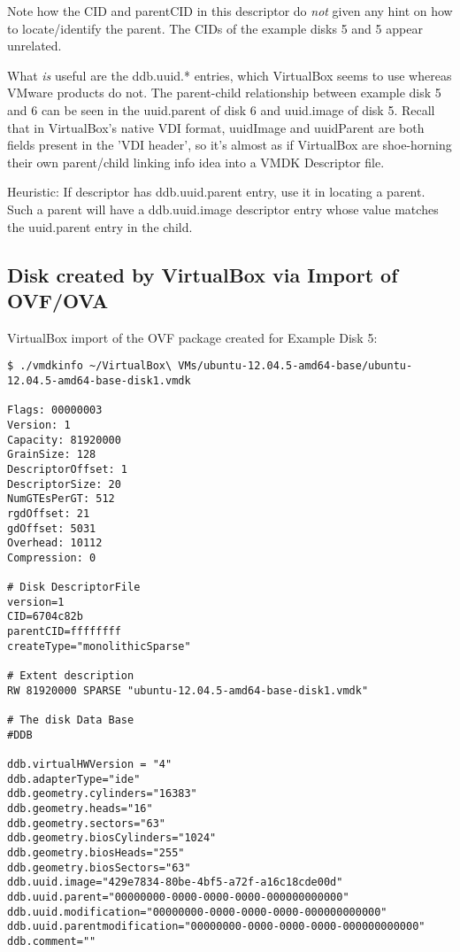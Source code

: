 \documentclass{article}
\begin{document}
Note how the CID and parentCID in this descriptor do {\em not} given
any hint on how to locate/identify the parent. The CIDs of the example
disks 5 and 5 appear unrelated.

What {\em is} useful are the ddb.uuid.* entries, which VirtualBox
seems to use whereas VMware products do not.  The parent-child
relationship between example disk 5 and 6 can be seen in the
uuid.parent of disk 6 and uuid.image of disk 5.  Recall that in
VirtualBox's native VDI format, uuidImage and uuidParent are both
fields present in the 'VDI header', so it's almost as if VirtualBox
are shoe-horning their own parent/child linking info idea into a VMDK
Descriptor file.


Heuristic: If descriptor has ddb.uuid.parent entry, use it in locating
a parent.  Such a parent will have a ddb.uuid.image descriptor entry
whose value matches the uuid.parent entry in the child.


\subsection{Disk created by VirtualBox via Import of OVF/OVA}

VirtualBox import of the OVF package created for Example Disk 5:

\begin{verbatim}
$ ./vmdkinfo ~/VirtualBox\ VMs/ubuntu-12.04.5-amd64-base/ubuntu-12.04.5-amd64-base-disk1.vmdk 

Flags: 00000003
Version: 1
Capacity: 81920000
GrainSize: 128
DescriptorOffset: 1
DescriptorSize: 20
NumGTEsPerGT: 512
rgdOffset: 21
gdOffset: 5031
Overhead: 10112
Compression: 0

# Disk DescriptorFile
version=1
CID=6704c82b
parentCID=ffffffff
createType="monolithicSparse"

# Extent description
RW 81920000 SPARSE "ubuntu-12.04.5-amd64-base-disk1.vmdk"

# The disk Data Base 
#DDB

ddb.virtualHWVersion = "4"
ddb.adapterType="ide"
ddb.geometry.cylinders="16383"
ddb.geometry.heads="16"
ddb.geometry.sectors="63"
ddb.geometry.biosCylinders="1024"
ddb.geometry.biosHeads="255"
ddb.geometry.biosSectors="63"
ddb.uuid.image="429e7834-80be-4bf5-a72f-a16c18cde00d"
ddb.uuid.parent="00000000-0000-0000-0000-000000000000"
ddb.uuid.modification="00000000-0000-0000-0000-000000000000"
ddb.uuid.parentmodification="00000000-0000-0000-0000-000000000000"
ddb.comment=""
\end{verbatim}
\end{document}
